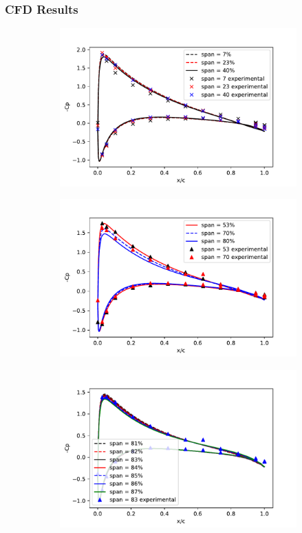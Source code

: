\documentclass{beamer}
\begin{document}
\begin{frame}
	\frametitle{CFD Results}
	\begin{figure}[!tbp]
		\begin{subfigure}[b]{0.4\linewidth}
			\includegraphics[width=\linewidth]{pressure_dist0.pdf}
		\end{subfigure}
		\hfill
		\begin{subfigure}[b]{0.4\linewidth}
			\includegraphics[width=\linewidth]{pressure_dist1.pdf}
		\end{subfigure}
	\hfill
		\begin{subfigure}[b]{0.4\linewidth}
			\includegraphics[width=\linewidth]{pressure_dist2.pdf}

\end{subfigure}
\end{figure}
\end{frame}
\end{document}
